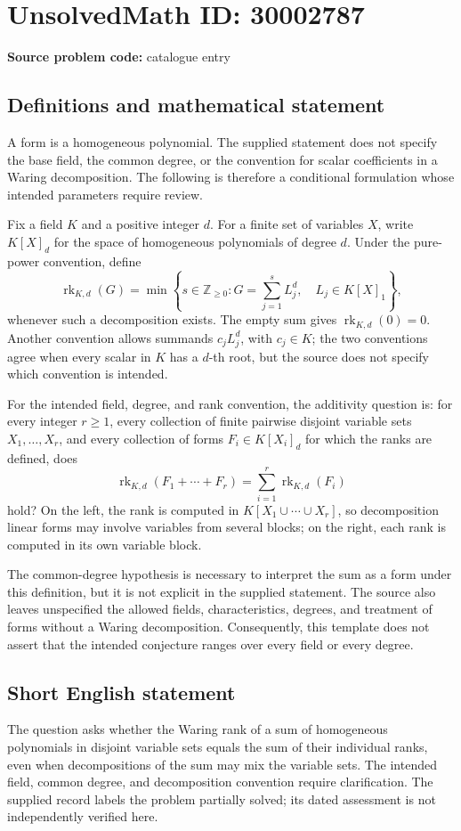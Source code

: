 \documentclass[11pt]{article}
\newcommand{\Z}{\mathbb{Z}}
\begin{document}
\section*{UnsolvedMath ID: 30002787}
\textbf{Source problem code:} catalogue entry
\subsection{Definitions and mathematical statement}
A form is a homogeneous polynomial. The supplied statement does not specify the base field, the common degree, or the convention for scalar coefficients in a Waring decomposition. The following is therefore a conditional formulation whose intended parameters require review.

Fix a field \(K\) and a positive integer \(d\). For a finite set of variables \(X\), write \(K[X]_d\) for the space of homogeneous polynomials of degree \(d\). Under the pure-power convention, define
\[
\operatorname{rk}_{K,d}(G)=\min\left\{s\in\Z_{\geq 0}:G=\sum_{j=1}^{s}L_j^d,\quad L_j\in K[X]_1\right\},
\]
whenever such a decomposition exists. The empty sum gives \(\operatorname{rk}_{K,d}(0)=0\). Another convention allows summands \(c_jL_j^d\), with \(c_j\in K\); the two conventions agree when every scalar in \(K\) has a \(d\)-th root, but the source does not specify which convention is intended.

For the intended field, degree, and rank convention, the additivity question is: for every integer \(r\geq 1\), every collection of finite pairwise disjoint variable sets \(X_1,\ldots,X_r\), and every collection of forms \(F_i\in K[X_i]_d\) for which the ranks are defined, does
\[
\operatorname{rk}_{K,d}\!\left(F_1+\cdots+F_r\right)
=\sum_{i=1}^{r}\operatorname{rk}_{K,d}(F_i)
\]
hold? On the left, the rank is computed in \(K[X_1\cup\cdots\cup X_r]\), so decomposition linear forms may involve variables from several blocks; on the right, each rank is computed in its own variable block.

The common-degree hypothesis is necessary to interpret the sum as a form under this definition, but it is not explicit in the supplied statement. The source also leaves unspecified the allowed fields, characteristics, degrees, and treatment of forms without a Waring decomposition. Consequently, this template does not assert that the intended conjecture ranges over every field or every degree.
\subsection{Short English statement}
The question asks whether the Waring rank of a sum of homogeneous polynomials in disjoint variable sets equals the sum of their individual ranks, even when decompositions of the sum may mix the variable sets. The intended field, common degree, and decomposition convention require clarification. The supplied record labels the problem partially solved; its dated assessment is not independently verified here.
\end{document}
